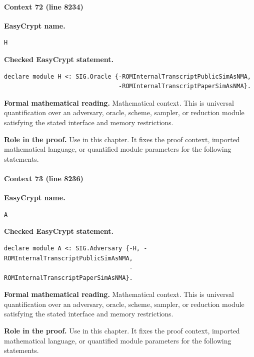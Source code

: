 \paragraph{Context 72 (line 8234)}
\noindent\textbf{EasyCrypt name.}
\begin{lstlisting}[language=EasyCrypt,basicstyle=\ttfamily\scriptsize]
H
\end{lstlisting}
\noindent\textbf{Checked EasyCrypt statement.}
\begin{lstlisting}[language=EasyCrypt,basicstyle=\ttfamily\scriptsize]
declare module H <: SIG.Oracle {-ROMInternalTranscriptPublicSimAsNMA,
                                -ROMInternalTranscriptPaperSimAsNMA}.
\end{lstlisting}
\noindent\textbf{Formal mathematical reading.}
Mathematical context. This is universal quantification over an adversary, oracle, scheme, sampler, or reduction module satisfying the stated interface and memory restrictions.

\noindent\textbf{Role in the proof.}
Use in this chapter. It fixes the proof context, imported mathematical language, or quantified module parameters for the following statements.

\paragraph{Context 73 (line 8236)}
\noindent\textbf{EasyCrypt name.}
\begin{lstlisting}[language=EasyCrypt,basicstyle=\ttfamily\scriptsize]
A
\end{lstlisting}
\noindent\textbf{Checked EasyCrypt statement.}
\begin{lstlisting}[language=EasyCrypt,basicstyle=\ttfamily\scriptsize]
declare module A <: SIG.Adversary {-H, -ROMInternalTranscriptPublicSimAsNMA,
                                   -ROMInternalTranscriptPaperSimAsNMA}.
\end{lstlisting}
\noindent\textbf{Formal mathematical reading.}
Mathematical context. This is universal quantification over an adversary, oracle, scheme, sampler, or reduction module satisfying the stated interface and memory restrictions.

\noindent\textbf{Role in the proof.}
Use in this chapter. It fixes the proof context, imported mathematical language, or quantified module parameters for the following statements.

